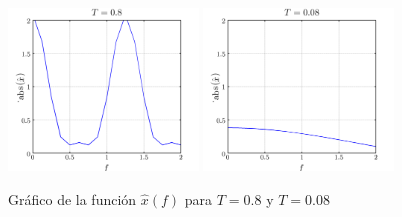 \documentclass[a4paper,12pt,final]{article}
\begin{document}
      \begin{figure}[H]
        \caption{Gráfico de la función $\hat{x}\left(f\right)$ para $T=0.8$ y $T=0.08$}
        \begin{center}
          \includegraphics[width=0.45\textwidth]{./laboratorio_4/problema06_a.png}
          \includegraphics[width=0.45\textwidth]{./laboratorio_4/problema06_b.png}
        \end{center}
      \end{figure}
\end{document}
